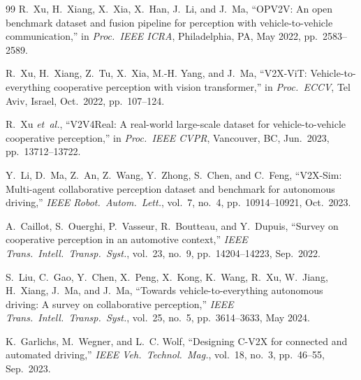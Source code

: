 \documentclass[sn-mathphys-num,Numbered,iicol]{sn-jnl}
\begin{document}
\begin{thebibliography}{99}
R.~Xu, H.~Xiang, X.~Xia, X.~Han, J.~Li, and J.~Ma, ``OPV2V: An open
benchmark dataset and fusion pipeline for perception with vehicle-to-vehicle
communication,'' in \textit{Proc.\ IEEE ICRA}, Philadelphia, PA, May 2022,
pp.~2583--2589.

R.~Xu, H.~Xiang, Z.~Tu, X.~Xia, M.-H. Yang, and J.~Ma, ``V2X-ViT:
Vehicle-to-everything cooperative perception with vision transformer,'' in
\textit{Proc.\ ECCV}, Tel Aviv, Israel, Oct.\ 2022, pp.~107--124.

R.~Xu \textit{et~al.}, ``V2V4Real: A real-world large-scale dataset for
vehicle-to-vehicle cooperative perception,'' in \textit{Proc.\ IEEE CVPR},
Vancouver, BC, Jun.\ 2023, pp.~13712--13722.

Y.~Li, D.~Ma, Z.~An, Z.~Wang, Y.~Zhong, S.~Chen, and C.~Feng, ``V2X-Sim:
Multi-agent collaborative perception dataset and benchmark for autonomous
driving,'' \textit{IEEE Robot.\ Autom.\ Lett.}, vol.~7, no.~4,
pp.~10914--10921, Oct.\ 2023.

A.~Caillot, S.~Ouerghi, P.~Vasseur, R.~Boutteau, and Y.~Dupuis, ``Survey
on cooperative perception in an automotive context,'' \textit{IEEE Trans.\
Intell.\ Transp.\ Syst.}, vol.~23, no.~9, pp.~14204--14223, Sep.\ 2022.

S.~Liu, C.~Gao, Y.~Chen, X.~Peng, X.~Kong, K.~Wang, R.~Xu, W.~Jiang, H.~Xiang,
J.~Ma, and J.~Ma, ``Towards vehicle-to-everything autonomous driving: A
survey on collaborative perception,'' \textit{IEEE Trans.\ Intell.\ Transp.\
Syst.}, vol.~25, no.~5, pp.~3614--3633, May 2024.

K.~Garlichs, M.~Wegner, and L.~C. Wolf, ``Designing C-V2X for connected and
automated driving,'' \textit{IEEE Veh.\ Technol.\ Mag.}, vol.~18, no.~3,
pp.~46--55, Sep.\ 2023.

\end{thebibliography}
\end{document}
